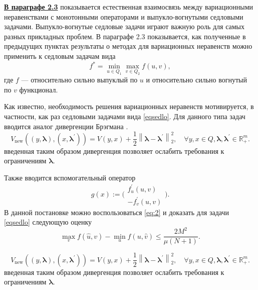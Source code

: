 \underline{\textbf{В параграфе 2.3}} показывается естественная взаимосвязь между вариационными неравенствами с монотонными операторами и выпукло-вогнутыми седловыми задачами. Выпукло-вогнутые седловые задачи играют важную роль для самых разных прикладных проблем. В параграфе 2.3 показывается, как полученные в предыдущих пунктах результаты о методах для вариационных неравенств можно применить к седловым задачам вида
\begin{equation}\label{eqsedlo}
    f^* = \min_{u \in Q_1} \max_{v \in Q_2} f(u, v),
\end{equation}
где $f$ --- относительно сильно выпуклый по $u$ и относительно сильно вогнутый по $v$ функционал.

\iffalse
    Как известно, необходимость решения вариационных неравенств мотивируется, в частности, как раз седловыми задачами вида \eqref{eqsedlo}. Для данного типа задач вводится аналог дивергенции Брэгмана \cite{Fedor_relative_adapuniv}. 
    $$
        V_{\text{new}}\left((y, \boldsymbol{\lambda}), (x, \boldsymbol{\lambda}^{'})\right) = V(y,x) + \frac{1}{2} \left\|\boldsymbol{\lambda} - \boldsymbol{\lambda}^{'}\right\|_2^2, \quad  \forall y, x \in Q, \boldsymbol{\lambda},  \boldsymbol{\lambda}^{'} \in \mathbb{R}_+^m.
    $$
    введенная таким образом дивергенция позволяет ослабить требования к ограничениям $\boldsymbol{\lambda}$.

    Также вводится вспомогательный оператор 
    \begin{equation}\label{operator-sedlo}
        g(x) := \Bigg( 
        \begin{aligned}
            f^{'}_{u}(u,v)\\
            -f^{'}_{v}(u,v)
        \end{aligned}
        \Bigg).
    \end{equation}
    В данной постановке можно воспользоваться \eqref{eq:2} и доказать для задачи \eqref{eqsedlo} следующую оценку
    \begin{equation}
        \max_{v} f(\widehat{u}, v) - \min_{u} f(u, \widehat{v}) \leq \frac{2M^2}{\mu (N+1)}.
    \end{equation}


    $$
        V_{\text{new}}\left((y, \boldsymbol{\lambda}), (x, \boldsymbol{\lambda}^{'})\right) = V(y,x) + \frac{1}{2} \left\|\boldsymbol{\lambda} - \boldsymbol{\lambda}^{'}\right\|_2^2, \quad  \forall y, x \in Q, \boldsymbol{\lambda},  \boldsymbol{\lambda}^{'} \in \mathbb{R}_+^m.
    $$
    введенная таким образом дивергенция позволяет ослабить требования к ограничениям $\boldsymbol{\lambda}$.

